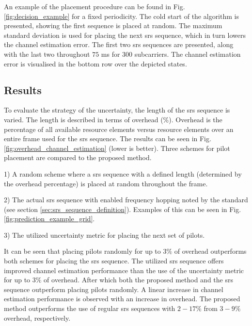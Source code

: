 An example of the placement procedure can be found in Fig. \ref{fig:decision_example} for a fixed periodicity. The cold start of the algorithm is presented,  showing the first sequence is placed at random. The maximum standard deviation is used for placing the next \gls{srs} sequence, which in turn lowers the channel estimation error. The first two  \gls{srs} sequences are presented, along with the last two throughout $75$ ms for $300$ subcarriers. The channel estimation error is visualised in the bottom row over the depicted states.

\subsection{Results}
To evaluate the strategy of the uncertainty, the length of the  \gls{srs} sequence is varied. The length is described in terms of overhead (\%). Overhead is the percentage of all available resource elements versus resource elements over an entire frame used for the \gls{srs} sequence. The results can be seen in Fig. \ref{fig:overhead_channel_estimation} (lower is better). Three schemes for pilot placement are compared to the proposed method. 

1) A random scheme where a \gls{srs} sequence with a defined length (determined by the overhead percentage) is placed at random throughout the frame. 

2) The actual \gls{srs} sequence with enabled frequency hopping noted by the standard (see section \ref{sec:srs_sequence_definition}). Examples of this can be seen in Fig. \ref{fig:prediction_example_grid}. 

3) The utilized uncertainty metric for placing the next set of pilots.

It can be seen that placing pilots randomly for up to $3\%$ of overhead outperforms both schemes for placing the \gls{srs} sequence. The utilized \gls{srs} sequence offers improved channel estimation performance than the use of the uncertainty metric for up to $3\%$ of overhead. After which both the proposed method and the \gls{srs} sequence outperform placing pilots randomly. A linear increase in channel estimation performance is observed with an increase in overhead. The proposed method outperforms the use of regular \gls{srs} sequences with $2-17\%$ from $3-9\%$ overhead, respectively.

